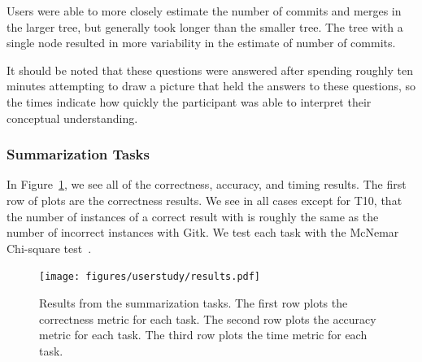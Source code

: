 Users were able to more closely estimate the number of commits and
merges in the larger tree, but generally took longer than the smaller
tree. The tree with a single node resulted in more variability in the
estimate of number of commits.

It should be noted that these questions were answered after spending
roughly ten minutes attempting to draw a picture that held the answers
to these questions, so the times indicate how quickly the participant
was able to interpret their conceptual understanding.

\subsubsection{Summarization Tasks}
\label{sub:summarization_tasks}

In Figure~\ref{fig:summarization_results}, we see all of the
correctness, accuracy, and timing results. The first row of plots are
the correctness results. 
We see in all cases except for T10, that the
number of instances of a correct result with \tool is roughly the same
as the number of incorrect instances with Gitk.
We test each task with
the McNemar Chi-square test~\cite{McNemar1947}.

\begin{figure}[htpb]
  \centering
  \texttt{[image: figures/userstudy/results.pdf]}
  \caption{Results from the summarization tasks. The first row plots the
    correctness metric for each task. The second row plots the
    accuracy metric for each task. The third row plots the time metric
    for each task.}
  \label{fig:summarization_results}
\end{figure}


